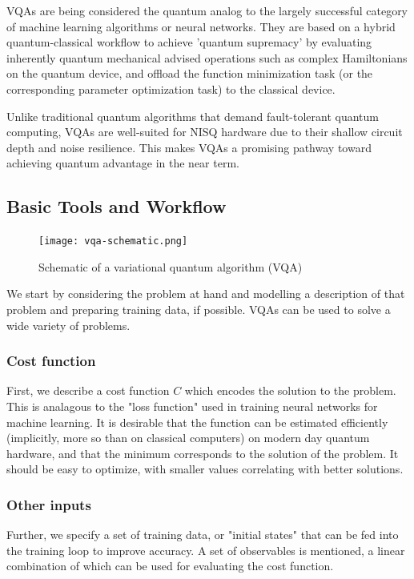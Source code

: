 \documentclass[11pt,a4paper]{article}
\begin{document}
VQAs are being considered the quantum analog to the largely successful category of machine learning algorithms or neural networks. They are based on a hybrid quantum-classical workflow to achieve 'quantum supremacy' by evaluating inherently quantum mechanical advised operations such as complex Hamiltonians on the quantum device, and offload the function minimization task (or the corresponding parameter optimization task) to the classical device.

Unlike traditional quantum algorithms that demand fault-tolerant quantum computing, VQAs are well-suited for NISQ hardware due to their shallow circuit depth and noise resilience. This makes VQAs a promising pathway toward achieving quantum advantage in the near term.

\subsection{Basic Tools and Workflow}

\begin{figure}[H]
    \centering
    \texttt{[image: vqa-schematic.png]}
    \caption{Schematic of a variational quantum algorithm (VQA)}
    \label{fig:vqa-schematic}
\end{figure}

We start by considering the problem at hand and modelling a description of that problem and preparing training data, if possible. VQAs can be used to solve a wide variety of problems.

\subsubsection{Cost function}

First, we describe a cost function $C$ which encodes the solution to the problem. This is analagous to the "loss function" used in training neural networks for machine learning. It is desirable that the function can be estimated efficiently (implicitly, more so than on classical computers) on modern day quantum hardware, and that the minimum corresponds to the solution of the problem. It should be easy to optimize, with smaller values correlating with better solutions.

\subsubsection{Other inputs}

Further, we specify a set of training data, or "initial states" that can be fed into the training loop to improve accuracy. A set of observables is mentioned, a linear combination of which can be used for evaluating the cost function.
\end{document}
